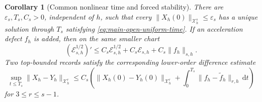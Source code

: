 \documentclass[11pt]{article}
\numberwithin{equation}{section}
\newtheorem{corollary}[corollary]{Corollary}
\theoremstyle{definition}
\theoremstyle{remark}
\newcommand{\dd}{\mathrm d}
\begin{document}
\begin{corollary}[Common nonlinear time and forced stability]
\label{cor:supp-open-lifespan}
There are $\varepsilon_s,T_s,C_s>0$, independent of $h$, such that every
$\|X_h(0)\|_{\mathcal X_h^s}\le\varepsilon_s$ has a unique solution through
$T_s$ satisfying \eqref{eq:main-open-uniform-time}.  If an acceleration defect
$f_h$ is added, then on the same smaller chart
\begin{equation}
 (\mathscr E_{s,h}^{1/2})'
 \le C_s\mathscr E_{s,h}^{1/2}+C_s\mathscr E_{s,h}
       +C_s\|f_h\|_{s,h}.
 \label{eq:supp-open-forced-energy}
\end{equation}
Two top-bounded records satisfy the corresponding lower-order difference
estimate
\begin{equation}
 \sup_{t\le T_s}\|X_h-Y_h\|_{\mathcal X_h^r}
 \le C_s\left(\|X_h(0)-Y_h(0)\|_{\mathcal X_h^r}
 +\int_0^{T_s}\|f_h-\widetilde f_h\|_{r,h}\,\dd t\right)
 \label{eq:supp-open-difference}
\end{equation}
for $3\le r\le s-1$.
\end{corollary}
\end{document}

